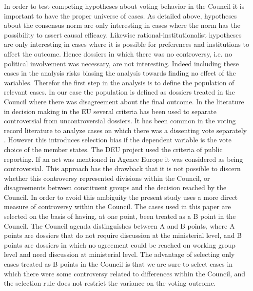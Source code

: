 In order to test competing hypotheses about voting behavior in the Council it is important to have the proper universe of cases. As detailed above, hypotheses about the consensus norm are only interesting in cases where the norm has the possibility to assert causal efficacy. Likewise rational-institutionalist hypotheses are only interesting in cases where it is possible for preferences and institutions to affect the outcome. Hence dossiers in which there was no controversy, i.e. no political involvement was necessary, are not interesting. Indeed including these cases in the analysis risks biasing the analysis towards finding no effect of the variables. Therefor the first step in the analysis is to define the population of relevant cases. In our case the population is defined as dossiers treated in the Council where there was disagreement about the final outcome. In the literature in decision making in the EU several criteria has been used to separate controversial from uncontroversial dossiers. It has been common in the voting record literature to analyze cases on which there was a dissenting vote separately \citep{Heisenberg2005,Hayes-renshaw2006,Hagemann2008}. However this introduces selection bias if the dependent variable is the vote choice of the member states. The DEU project \citep{Thomson2006a} used the criteria of public reporting. If an act was mentioned in Agence Europe it was considered as being controversial. This approach has the drawback that it is not possible to discern whether this controversy represented divisions within the Council, or disagreements between constituent groups and the decision reached by the Council. In order to avoid this ambiguity the present study uses a more direct measure of controversy within the Council. The cases used in this paper are selected on the basis of having, at one point, been treated as a B point in the Council. The Council agenda distinguishes between A and B points, where A points are dossiers that do not require discussion at the ministerial level, and B points are dossiers in which no agreement could be reached on working group level and need discussion at ministerial level. The advantage of selecting only cases treated as B points in the Council is that we are sure to select cases in which there were some controversy related to differences within the Council, and the selection rule does not restrict the variance on the voting outcome. 

